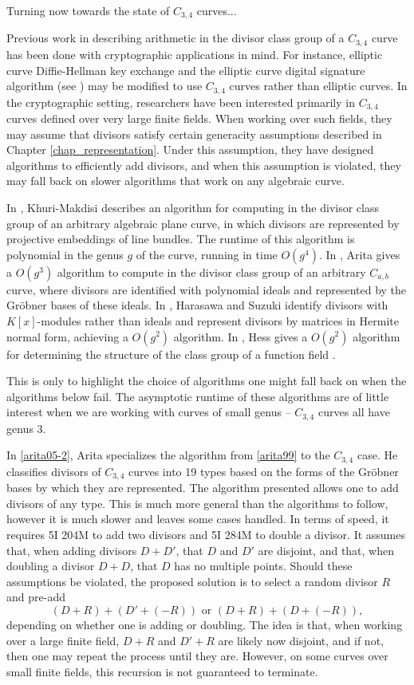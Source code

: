 Turning now towards the state of $C_{3,4}$ curves...

Previous work in describing arithmetic in the divisor class group of a $C_{3,4}$ curve has been done with cryptographic applications in mind.
For instance, elliptic curve Diffie-Hellman key exchange and the elliptic curve digital signature algorithm (see )
may be modified to use $C_{3,4}$ curves rather than elliptic curves.
In the cryptographic setting, researchers have been interested primarily in $C_{3,4}$ curves defined over very large finite fields.
When working over such fields, they may assume that divisors satisfy certain generacity assumptions described in Chapter \ref{chap_representation}.
Under this assumption, they have designed algorithms to efficiently add divisors,
and when this assumption is violated, they may fall back on slower algorithms that work on any algebraic curve.

In \cite{makdisi04}, Khuri-Makdisi describes an algorithm for computing in the divisor class group of an arbitrary algebraic plane curve,
in which divisors are represented by projective embeddings of line bundles.
The runtime of this algorithm is polynomial in the genus $g$ of the curve, running in time $O(g^4)$.
In \cite{arita99}, Arita gives a $O(g^3)$ algorithm to compute in the divisor class group of an arbitrary $C_{a,b}$ curve,
where divisors are identified with polynomial ideals and represented by the Gr\"obner bases of these ideals.
In \cite{harasawa00}, Harasawa and Suzuki identify divisors with $K[x]$-modules rather than ideals and represent divisors by matrices in Hermite normal form,
achieving a $O(g^2)$ algorithm.
In \cite{hess99}, Hess gives a $O(g^2)$ algorithm for determining the structure of the class group of a function field 
.

This is only to highlight the choice of algorithms one might fall back on when the algorithms below fail.
The asymptotic runtime of these algorithms are of little interest when we are working with curves of small genus --
$C_{3,4}$ curves all have genus 3.

In \ref{arita05-2}, Arita specializes the algorithm from \ref{arita99} to the $C_{3,4}$ case.
He classifies divisors of $C_{3,4}$ curves into 19 types based on the forms of the Gr\"obner bases by which they are represented.
The algorithm presented allows one to add divisors of any type.
This is much more general than the algorithms to follow, however it is much slower and leaves some cases handled.
In terms of speed, it requires 5I 204M to add two divisors and 5I 284M to double a divisor.
It assumes that, when adding divisors $D + D'$, that $D$ and $D'$ are disjoint,
and that, when doubling a divisor $D + D$, that $D$ has no multiple points.
Should these assumptions be violated, the proposed solution is to select a random divisor $R$ and pre-add
\[  (D + R) + (D' + (-R)) \text { or } (D + R) + (D + (-R)), \]
depending on whether one is adding or doubling.
The idea is that, when working over a large finite field, $D + R$ and $D' + R$ are likely now disjoint,
and if not, then one may repeat the process until they are.
However, on some curves over small finite fields, this recursion is not guaranteed to terminate.

